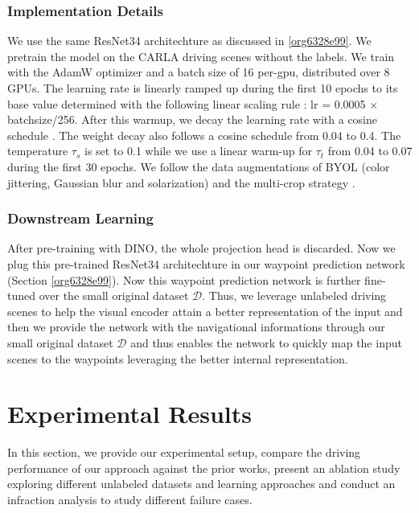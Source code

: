 \documentclass[12pt, letterpaper,cleardoubleempty,BCOR1cm]{scrbook}
\begin{document}
\subsection{Implementation Details}
\label{sec:org9a9d5ac}
We use the same ResNet34 architechture as discussed in \ref{org6328e99}. We pretrain the
model on the CARLA driving scenes without the labels. We train with the AdamW
optimizer \cite{Loshchilov2017} and a batch size of 16 per-gpu, distributed over
8 GPUs. The learning rate is linearly ramped up during the first 10 epochs to
its base value determined with the following linear scaling rule
\cite{Goyal2017}: lr = 0.0005 \(\times\) batchsize/256. After this warmup, we decay the
learning rate with a cosine schedule \cite{Loshchilov2016}. The weight decay
also follows a cosine schedule from 0.04 to 0.4. The temperature \(\tau_{s}\) is
set to 0.1 while we use a linear warm-up for \(\tau_{t}\) from 0.04 to 0.07 during
the first 30 epochs. We follow the data augmentations of BYOL \cite{Grill2020}
(color jittering, Gaussian blur and solarization) and the multi-crop strategy
\cite{Caron2020}. 

\subsection{Downstream Learning}
\label{sec:org93ba91d}
After pre-training with DINO, the whole projection head is discarded.  Now we
plug this pre-trained ResNet34 architechture in our waypoint prediction network
(Section \ref{org6328e99}). Now this waypoint prediction network is further fine-tuned over
the small original dataset \(\mathcal{D}\). Thus, we leverage unlabeled driving scenes
to help the visual encoder attain a better representation of the input and then
we provide the network with the navigational informations through our small
original dataset \(\mathcal{D}\) and thus enables the network to quickly map the input
scenes to the waypoints leveraging the better internal representation. 

\chapter{Experimental Results \label{orgb8662bc}}
\label{sec:org5f9f6a1}

In this section, we provide our experimental setup, compare the driving
performance of our approach against the prior works, present an ablation study
exploring different unlabeled datasets and learning approaches and conduct an
infraction analysis to study different failure cases.
\end{document}
